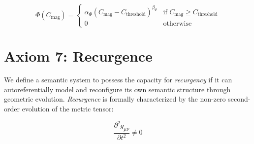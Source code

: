 \begin{equation}
\Phi(C_{\text{mag}}) = \begin{cases}
\alpha_{\Phi} (C_{\text{mag}} - C_{\text{threshold}})^{\beta_{\Phi}} & \text{if } C_{\text{mag}} \geq C_{\text{threshold}} \\
0 & \text{otherwise}
\end{cases}
\end{equation}


\section{Axiom 7: Recurgence}
\label{1.7:axiom_7_recurgence}

We define a semantic system to possess the capacity for \textit{recurgency} if it can autoreferentially model and reconfigure its own semantic structure through geometric evolution. \textit{Recurgence} is formally characterized by the non-zero second-order evolution of the metric tensor:

\begin{equation}
\frac{\partial^2 g_{\mu\nu}}{\partial t^2} \neq 0
\end{equation} 